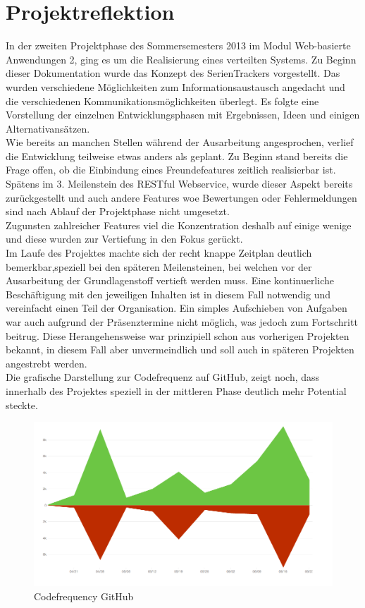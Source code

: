 \chapter{Projektreflektion}
In der zweiten Projektphase des Sommersemesters 2013 im Modul Web-basierte Anwendungen 2, ging es um die Realisierung eines verteilten Systems. Zu Beginn dieser Dokumentation wurde das Konzept des SerienTrackers vorgestellt. Das wurden verschiedene Möglichkeiten zum Informationsaustausch angedacht und die verschiedenen Kommunikationsmöglichkeiten überlegt. Es folgte eine Vorstellung der einzelnen Entwicklungsphasen mit Ergebnissen, Ideen und einigen Alternativansätzen.\\


Wie bereits an manchen Stellen während der Ausarbeitung angesprochen, verlief die Entwicklung teilweise etwas anders als geplant. Zu Beginn stand bereits die Frage offen, ob die Einbindung eines Freundefeatures zeitlich realisierbar ist. Spätens im 3. Meilenstein des RESTful Webservice, wurde dieser Aspekt bereits zurückgestellt und auch andere Features woe Bewertungen oder Fehlermeldungen sind nach Ablauf der Projektphase nicht umgesetzt.\\
Zugunsten zahlreicher Features viel die Konzentration deshalb auf einige wenige und diese wurden zur Vertiefung in den Fokus gerückt.\\
Im Laufe des Projektes machte sich der recht knappe Zeitplan deutlich bemerkbar,speziell bei den späteren Meilensteinen, bei welchen vor der Ausarbeitung der Grundlagenstoff vertieft werden muss. Eine kontinuerliche Beschäftigung mit den jeweiligen Inhalten ist in diesem Fall notwendig und vereinfacht einen Teil der Organisation. Ein simples Aufschieben von Aufgaben war auch aufgrund der Präsenztermine nicht möglich, was jedoch zum Fortschritt beitrug. Diese Herangehensweise war prinzipiell schon aus vorherigen Projekten bekannt, in diesem Fall aber unvermeindlich und soll auch in späteren Projekten angestrebt werden.\\
Die grafische Darstellung zur Codefrequenz auf GitHub, zeigt noch, dass innerhalb des Projektes speziell in der mittleren Phase deutlich mehr Potential steckte.

\begin{figure}[H]
\includegraphics[width=1\textwidth]{../images/statistik.jpg}
\caption{Codefrequency GitHub }
\label{codefrequency}
\end{figure}

